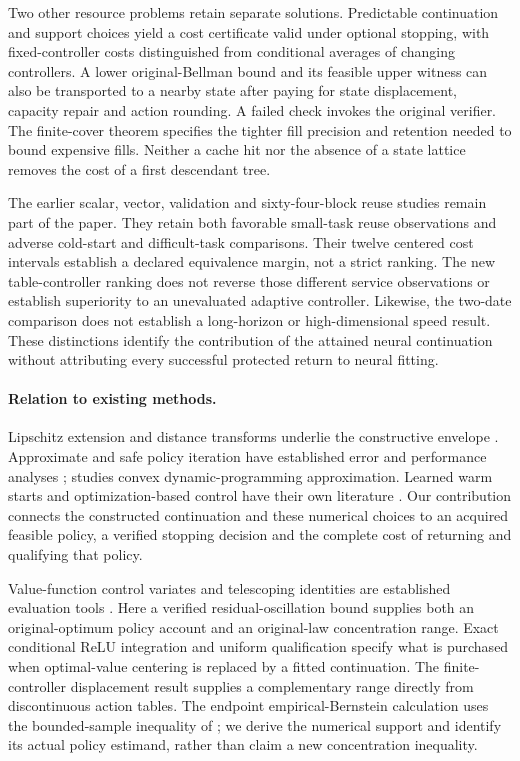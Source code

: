 \documentclass[ecta,nameyear,draft]{econsocart}
\begin{document}
Two other resource problems retain separate solutions. Predictable continuation and support choices yield a cost certificate valid under optional stopping, with fixed-controller costs distinguished from conditional averages of changing controllers. A lower original-Bellman bound and its feasible upper witness can also be transported to a nearby state after paying for state displacement, capacity repair and action rounding. A failed check invokes the original verifier. The finite-cover theorem specifies the tighter fill precision and retention needed to bound expensive fills. Neither a cache hit nor the absence of a state lattice removes the cost of a first descendant tree.

The earlier scalar, vector, validation and sixty-four-block reuse studies remain part of the paper. They retain both favorable small-task reuse observations and adverse cold-start and difficult-task comparisons. Their twelve centered cost intervals establish a declared equivalence margin, not a strict ranking. The new table-controller ranking does not reverse those different service observations or establish superiority to an unevaluated adaptive controller. Likewise, the two-date comparison does not establish a long-horizon or high-dimensional speed result. These distinctions identify the contribution of the attained neural continuation without attributing every successful protected return to neural fitting.

\paragraph{Relation to existing methods.}
Lipschitz extension and distance transforms underlie the constructive envelope \citep{mcshane1934,felzenszwalb2012}. Approximate and safe policy iteration have established error and performance analyses \citep{munos2003,pirotta2013,scherrer2015}; \citet{yang2020convex} studies convex dynamic-programming approximation. Learned warm starts and optimization-based control have their own literature \citep{sakaue2023warm,sambharya2023,agrawal2020control}. Our contribution connects the constructed continuation and these numerical choices to an acquired feasible policy, a verified stopping decision and the complete cost of returning and qualifying that policy.

Value-function control variates and telescoping identities are established evaluation tools \citep{munos2006variance,jiang2016}. Here a verified residual-oscillation bound supplies both an original-optimum policy account and an original-law concentration range. Exact conditional ReLU integration and uniform qualification specify what is purchased when optimal-value centering is replaced by a fitted continuation. The finite-controller displacement result supplies a complementary range directly from discontinuous action tables. The endpoint empirical-Bernstein calculation uses the bounded-sample inequality of \citet{maurer2009}; we derive the numerical support and identify its actual policy estimand, rather than claim a new concentration inequality.
\end{document}
